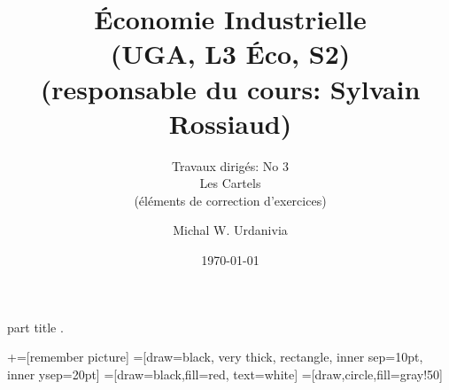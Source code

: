 
\usepackage{color}
\usepackage{tikz}
\usetikzlibrary{positioning}
\usepackage{enumerate}   
\usepackage{multirow}
%
  \usepackage{eso-pic}

{
    \begin{centering}
    \begin{beamercolorbox}[sep=11pt,center]{part title}
    \thesection.~\insertsection\par
    \end{beamercolorbox}
    \end{centering}
}
\title[]{ \textbf{Économie Industrielle} \\ (UGA, L3 Éco, S2) \\ (responsable du cours: Sylvain Rossiaud)}
\subtitle{Travaux dirigés: No 3\\ 
Les Cartels\\(éléments de correction d'exercices)}
\date{\today}
\author{Michal W. Urdanivia\inst{*}}




\usetikzlibrary{positioning}
\usetikzlibrary{snakes}
\usetikzlibrary{calc}
\usetikzlibrary{arrows}
\usetikzlibrary{decorations.markings}
\usetikzlibrary{shapes.misc}
\usetikzlibrary{matrix,shapes,arrows,fit,tikzmark}
\usetikzlibrary{shapes}
\newcommand\marktopleft[1]{
    \tikz[overlay,remember picture] 
        \node (marker-#1-a) at (-.3em,.3em) {};%
}
\newcommand\markbottomright[2]{%
    \tikz[overlay,remember picture] 
        \node (marker-#1-b) at (0em,0em) {};%
}
+=[remember picture] 
 =[draw=black, very thick, rectangle, inner sep=10pt, inner ysep=20pt]
 =[draw=black,fill=red, text=white]
=[draw,circle,fill=gray!50]



